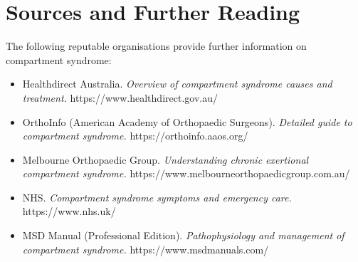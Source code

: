 \section*{Sources and Further Reading}
The following reputable organisations provide further information on compartment syndrome:
\begin{itemize}
    \item Healthdirect Australia. \textit{Overview of compartment syndrome causes and treatment.} https://www.healthdirect.gov.au/
    \item OrthoInfo (American Academy of Orthopaedic Surgeons). \textit{Detailed guide to compartment syndrome.} https://orthoinfo.aaos.org/
    \item Melbourne Orthopaedic Group. \textit{Understanding chronic exertional compartment syndrome.} https://www.melbourneorthopaedicgroup.com.au/
    \item NHS. \textit{Compartment syndrome symptoms and emergency care.} https://www.nhs.uk/
    \item MSD Manual (Professional Edition). \textit{Pathophysiology and management of compartment syndrome.} https://www.msdmanuals.com/
\end{itemize}
